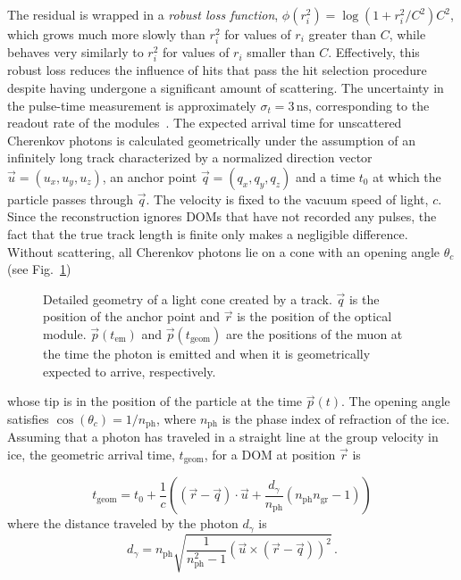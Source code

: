 The residual is wrapped in a \emph{robust loss function}, $\phi(r_{i}^{2})=\log\left(1+r_{i}^{2}/C^2\right)C^2$, which grows much more slowly than $r_{i}^{2}$ for values of $r_i$ greater than $C$, while behaves very similarly to $r_i^2$ for values of $r_i$ smaller than $C$. Effectively, this robust loss reduces the influence of hits that pass the hit selection procedure despite having undergone a significant amount of scattering. The uncertainty in the pulse-time measurement is approximately $\sigma_{t}=3\,\mathrm{ns}$, corresponding to the readout rate of the modules~\cite{icecube_daq}.
The expected arrival time for unscattered Cherenkov photons is calculated geometrically under the assumption of an infinitely long track characterized by a normalized direction vector $\vec{u}=(u_{x},u_{y},u_{z})$,
an anchor point $\vec{q}=(q_{x},q_{y},q_{z})$ and a time $t_{0}$
at which the particle passes through $\vec{q}$. The
velocity is fixed to the vacuum speed of light, $c$. Since the reconstruction ignores DOMs that have not recorded any pulses, the fact that the true track length is finite only makes a negligible  difference.
Without scattering, all Cherenkov photons lie on a cone with an opening
angle $\theta_{c}$ (see Fig.~\ref{fig:Detailed-track-geometry})
\begin{figure}[h]
\begin{centering}
\par
\end{centering}
\caption{\label{fig:Detailed-track-geometry}Detailed geometry of a light cone
created by a track. $\vec{q}$ is the position of the anchor point
and $\vec{r}$ is the position of the optical module. $\vec{p}(t_{\mathrm{em}})$
and $\vec{p}(t_{\mathrm{geom}})$ are the positions of the muon at
the time the photon is emitted and when it is geometrically expected
to arrive, respectively.}
\end{figure}
whose tip is in the position of the particle at the time $\vec{p}(t)$. The opening angle satisfies $\cos(\theta_c)=1/n_{\mathrm{ph}}$, where $n_{\mathrm{ph}}$ is the phase index of refraction of the ice.
Assuming that a photon has traveled in a straight line at the group velocity in ice, the geometric arrival time, $t_{\mathrm{geom}}$, for a DOM at position $\vec{r}$ is

\begin{equation}
t_{\mathrm{geom}}=t_{0}+\frac{1}{c}\left(\left(\vec{r}-\vec{q}\right)\cdot\vec{u}+\frac{d_{\gamma}}{n_{\mathrm{ph}}}\left(n_{\mathrm{ph}}n_{\mathrm{gr}}-1\right)\right)\label{eq:t_geom-MS-track}
\end{equation}
where the distance traveled by the photon $d_\gamma$ is
\begin{equation}
d_{\gamma}=n_{\mathrm{ph}}\sqrt{\frac{1}{n_{\mathrm{ph}}^{2}-1}\left(\vec{u}\times\left(\vec{r}-\vec{q}\right)\right)^{2}}\,.\label{eq:photon-distance-3d}
\end{equation}


